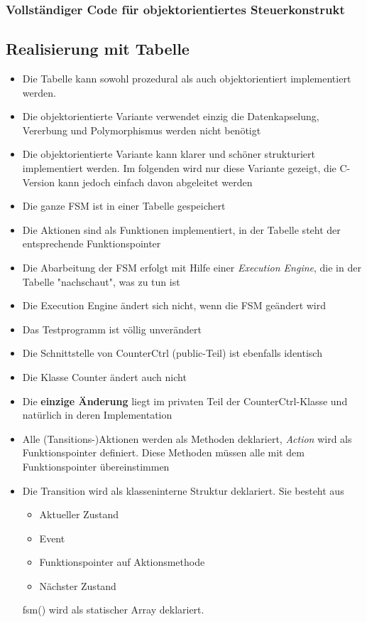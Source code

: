 \subsubsection{Vollständiger Code für objektorientiertes Steuerkonstrukt}



\subsection{Realisierung mit Tabelle}
\begin{itemize}
  \item Die Tabelle kann sowohl prozedural als auch objektorientiert implementiert werden.
  \item Die objektorientierte Variante verwendet einzig die Datenkapselung, Vererbung und Polymorphismus werden nicht benötigt
  \item Die objektorientierte Variante kann klarer und schöner strukturiert implementiert werden. Im folgenden wird nur diese Variante gezeigt, die C-Version kann jedoch einfach davon abgeleitet werden
  \item Die ganze FSM ist in einer Tabelle gespeichert
  \item Die Aktionen sind als Funktionen implementiert, in der Tabelle steht der entsprechende Funktionspointer
  \item Die Abarbeitung der FSM erfolgt mit Hilfe einer \textit{Execution Engine}, die in der Tabelle "nachschaut", was zu tun ist
  \item Die Execution Engine ändert sich nicht, wenn die FSM geändert wird
  \item Das Testprogramm ist völlig unverändert
  \item Die Schnittstelle von CounterCtrl (public-Teil) ist ebenfalls identisch
  \item Die Klasse Counter ändert auch nicht
  \item Die \textbf{einzige Änderung} liegt im privaten Teil der
        CounterCtrl-Klasse und natürlich in deren Implementation
  \item Alle (Tansitions-)Aktionen werden als Methoden deklariert,
  \textit{Action} wird als Funktionspointer definiert. Diese Methoden müssen
  alle mit dem Funktionspointer übereinstimmen
  

 \item Die Transition wird als klasseninterne Struktur deklariert. Sie besteht
 aus
 \begin{itemize}
   \item Aktueller Zustand
   \item Event
   \item Funktionspointer auf Aktionsmethode
   \item Nächster Zustand
 \end{itemize}
fsm() wird als statischer Array deklariert.



\end{itemize}

